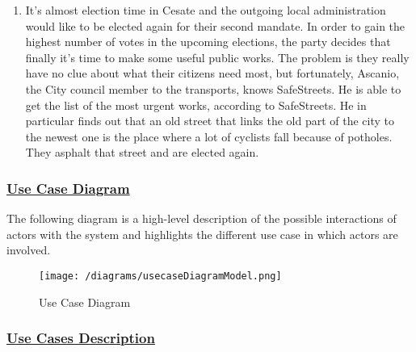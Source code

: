 \begin{enumerate}[label=\textbf{AS\arabic*}]
			\item \label{sce:advancedAuthority} It’s almost election time in Cesate and the outgoing local administration would like to be elected again for their second mandate. In order to gain the highest number of votes in the upcoming elections, the party decides that finally it’s time to make some useful public works. The problem is they really have no clue about what their citizens need most, but fortunately, Ascanio, the City council member to the transports, knows SafeStreets. He is able to get the list of the most urgent works, according to SafeStreets. He in particular finds out that an old street that links the old part of the city to the newest one is the place where a lot of cyclists fall because of potholes. They asphalt that street and are elected again.
		\end{enumerate}
	
		\newpage
		
	\subsubsection[Use Cases Diagrams]{\hyperlink{toc}{Use Case Diagram}}
		The following diagram is a high-level description of the possible interactions of actors with the system and highlights the different use case in which actors are involved.
		
		\vspace{0.3cm}
		
		\begin{figure}[h!]
			\centering
			\texttt{[image: /diagrams/usecaseDiagramModel.png]}
			\caption{Use Case Diagram}
		\end{figure}
	
		\FloatBarrier
	
	\subsubsection[Use Cases Description]{\hyperlink{toc}{Use Cases Description}}
		\label{sec:useCases}
		
